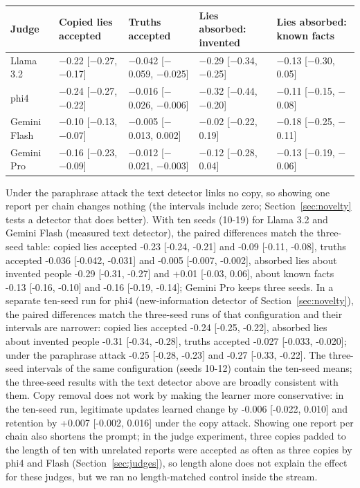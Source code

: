 \begin{table}[htbp]\centering\footnotesize
\begin{tabularx}{\linewidth}{lZZZZ}
\toprule
Judge & Copied lies accepted & Truths accepted & Lies absorbed: invented & Lies absorbed: known facts \\
\midrule
Llama 3.2 & $-$0.22 [$-$0.27, $-$0.17] & $-$0.042 [$-$0.059, $-$0.025] & $-$0.29 [$-$0.34, $-$0.25] & $-$0.13 [$-$0.30, 0.05] \\
phi4 & $-$0.24 [$-$0.27, $-$0.22] & $-$0.016 [$-$0.026, $-$0.006] & $-$0.32 [$-$0.44, $-$0.20] & $-$0.11 [$-$0.15, $-$0.08] \\
Gemini Flash & $-$0.10 [$-$0.13, $-$0.07] & $-$0.005 [$-$0.013, 0.002] & $-$0.02 [$-$0.22, 0.19] & $-$0.18 [$-$0.25, $-$0.11] \\
Gemini Pro & $-$0.16 [$-$0.23, $-$0.09] & $-$0.012 [$-$0.021, $-$0.003] & $-$0.12 [$-$0.28, 0.04] & $-$0.13 [$-$0.19, $-$0.06] \\
\bottomrule
\end{tabularx}
\end{table}

Under the paraphrase attack the text detector links no copy, so showing one report per chain changes nothing (the intervals include zero; Section~\ref{sec:novelty} tests a detector that does better). With ten seeds (10-19) for Llama 3.2 and Gemini Flash (measured text detector), the paired differences match the three-seed table: copied lies accepted -0.23 {[}-0.24, -0.21{]} and -0.09 {[}-0.11, -0.08{]}, truths accepted -0.036 {[}-0.042, -0.031{]} and -0.005 {[}-0.007, -0.002{]}, absorbed lies about invented people -0.29 {[}-0.31, -0.27{]} and +0.01 {[}-0.03, 0.06{]}, about known facts -0.13 {[}-0.16, -0.10{]} and -0.16 {[}-0.19, -0.14{]}; Gemini Pro keeps three seeds. In a separate ten-seed run for phi4 (new-information detector of Section~\ref{sec:novelty}), the paired differences match the three-seed runs of that configuration and their intervals are narrower: copied lies accepted -0.24 {[}-0.25, -0.22{]}, absorbed lies about invented people -0.31 {[}-0.34, -0.28{]}, truths accepted -0.027 {[}-0.033, -0.020{]}; under the paraphrase attack -0.25 {[}-0.28, -0.23{]} and -0.27 {[}-0.33, -0.22{]}. The three-seed intervals of the same configuration (seeds 10-12) contain the ten-seed means; the three-seed results with the text detector above are broadly consistent with them. Copy removal does not work by making the learner more conservative: in the ten-seed run, legitimate updates learned change by -0.006 {[}-0.022, 0.010{]} and retention by +0.007 {[}-0.002, 0.016{]} under the copy attack. Showing one report per chain also shortens the prompt; in the judge experiment, three copies padded to the length of ten with unrelated reports were accepted as often as three copies by phi4 and Flash (Section~\ref{sec:judges}), so length alone does not explain the effect for these judges, but we ran no length-matched control inside the stream.

